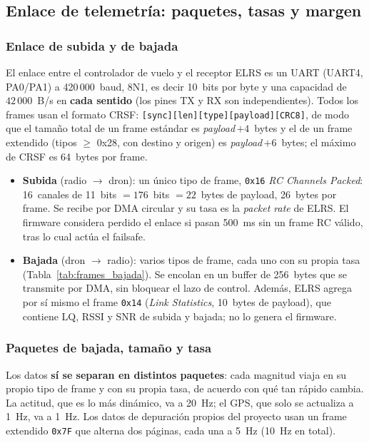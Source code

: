 \documentclass[12pt, letterpaper]{report}
\begin{document}
\subsection{Enlace de telemetría: paquetes, tasas y margen}
\subsubsection{Enlace de subida y de bajada}
El enlace entre el controlador de vuelo y el receptor ELRS es un UART (UART4, PA0/PA1) a 420\,000~baud, 8N1, es decir 10~bits por byte y una capacidad de $42\,000$~B/s en \textbf{cada sentido} (los pines TX y RX son independientes). Todos los frames usan el formato CRSF: \texttt{[sync][len][type][payload][CRC8]}, de modo que el tamaño total de un frame estándar es \textit{payload}\,$+4$~bytes y el de un frame extendido (tipos $\ge$ 0x28, con destino y origen) es \textit{payload}\,$+6$~bytes; el máximo de CRSF es 64~bytes por frame.
\begin{itemize}
    \item \textbf{Subida} (radio $\rightarrow$ dron): un único tipo de frame, \texttt{0x16} \textit{RC Channels Packed}: 16~canales de 11~bits $= 176$~bits $= 22$~bytes de payload, 26~bytes por frame. Se recibe por DMA circular y su tasa es la \textit{packet rate} de ELRS. El firmware considera perdido el enlace si pasan 500~ms sin un frame RC válido, tras lo cual actúa el failsafe.
    \item \textbf{Bajada} (dron $\rightarrow$ radio): varios tipos de frame, cada uno con su propia tasa (Tabla~\ref{tab:frames_bajada}). Se encolan en un buffer de 256~bytes que se transmite por DMA, sin bloquear el lazo de control. Además, ELRS agrega por sí mismo el frame \texttt{0x14} (\textit{Link Statistics}, 10~bytes de payload), que contiene LQ, RSSI y SNR de subida y bajada; no lo genera el firmware.
\end{itemize}

\subsubsection{Paquetes de bajada, tamaño y tasa}
Los datos \textbf{sí se separan en distintos paquetes}: cada magnitud viaja en su propio tipo de frame y con su propia tasa, de acuerdo con qué tan rápido cambia. La actitud, que es lo más dinámico, va a 20~Hz; el GPS, que solo se actualiza a 1~Hz, va a 1~Hz. Los datos de depuración propios del proyecto usan un frame extendido \texttt{0x7F} que alterna dos páginas, cada una a 5~Hz (10~Hz en total).
\end{document}
